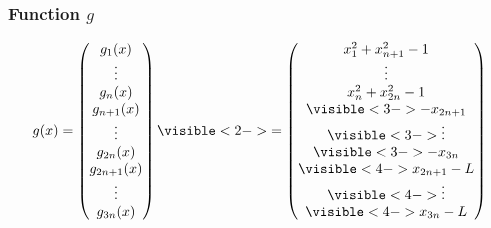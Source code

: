 \documentclass[10pt]{beamer}
\begin{document}
\begin{frame}
    \frametitle{Function $g$}
\[
g(x)=\begin{pmatrix} 
g_1(x)\\ \vdots \\ g_n(x) \\ g_{n+1}(x) \\ \vdots \\ g_{2n}(x) \\ g_{2n+1}(x)\\ \vdots \\ g_{3n}(x) 
\end{pmatrix} 
\visible<2->{ = \begin{pmatrix} 
x_1^2 + x_{n+1}^2 - 1 \\ \vdots \\ x_n^2 + x_{2n}^2 - 1\\ \visible<3->{ -x_{2n+1}}\\ \visible<3->{\vdots} \\ \visible<3->{-x_{3n}} \\ \visible<4->{x_{2n+1}-L} \\ \visible<4->{\vdots} \\\visible<4->{x_{3n}-L}
\end{pmatrix}}
\]
\end{frame}
\end{document}
